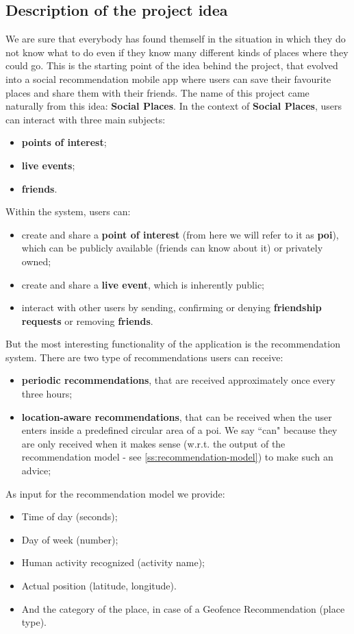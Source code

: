 \documentclass[../../main]{subfiles}
\begin{document}
\label{ss:description-project-idea}
\subsection{Description of the project idea}
We are sure that everybody has found themself in the situation in which they do not know what to do even if they know many different kinds of places where they could go.
This is the starting point of the idea behind the project, that evolved into a social recommendation mobile app where users can save their favourite places and share them with their friends.
The name of this project came naturally from this idea: \textbf{Social Places}.
In the context of \textbf{Social Places}, users can interact with three main subjects:
\begin{itemize}
    \item \textbf{points of interest};
    \item \textbf{live events};
    \item \textbf{friends}.
\end{itemize}
Within the system, users can:
\begin{itemize}
    \item create and share a \textbf{point of interest} (from here we will refer to it as \textbf{poi}), which can be publicly available (friends can know about it) or privately owned;
    \item create and share a \textbf{live event}, which is inherently public;
    \item interact with other users by sending, confirming or denying \textbf{friendship requests} or removing \textbf{friends}.
\end{itemize}
But the most interesting functionality of the application is the recommendation system.
There are two type of recommendations users can receive:
\begin{itemize}
    \item \textbf{periodic recommendations}, that are received approximately once every three hours;
    \item \textbf{location-aware recommendations}, that can be received when the user enters inside a predefined circular area of a poi.
    We say ``can" because they are only received when it makes sense (w.r.t. the output of the recommendation model - see \ref{ss:recommendation-model}) to make such an advice;
\end{itemize}
As input for the recommendation model we provide:
\begin{itemize}
    \item Time of day (seconds);
    \item Day of week (number);
    \item Human activity recognized (activity name);
    \item Actual position (latitude, longitude).
    \item And the category of the place, in case of a Geofence Recommendation (place type).
\end{itemize} 
\end{document}
